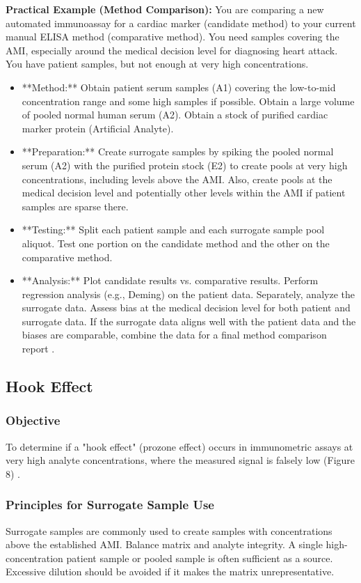 \documentclass{article}
\begin{document}
\textbf{Practical Example (Method Comparison):}
You are comparing a new automated immunoassay for a cardiac marker (candidate method) to your current manual ELISA method (comparative method). You need samples covering the AMI, especially around the medical decision level for diagnosing heart attack. You have patient samples, but not enough at very high concentrations.
\begin{itemize}
    \item **Method:** Obtain patient serum samples (A1) covering the low-to-mid concentration range and some high samples if possible. Obtain a large volume of pooled normal human serum (A2). Obtain a stock of purified cardiac marker protein (Artificial Analyte).
    \item **Preparation:** Create surrogate samples by spiking the pooled normal serum (A2) with the purified protein stock (E2) to create pools at very high concentrations, including levels above the AMI. Also, create pools at the medical decision level and potentially other levels within the AMI if patient samples are sparse there.
    \item **Testing:** Split each patient sample and each surrogate sample pool aliquot. Test one portion on the candidate method and the other on the comparative method.
    \item **Analysis:** Plot candidate results vs. comparative results. Perform regression analysis (e.g., Deming) on the patient data. Separately, analyze the surrogate data. Assess bias at the medical decision level for both patient and surrogate data. If the surrogate data aligns well with the patient data and the biases are comparable, combine the data for a final method comparison report \cite{CLSIEP09}.
\end{itemize}

\subsection{Hook Effect}

\subsubsection{Objective}
To determine if a "hook effect" (prozone effect) occurs in immunometric assays at very high analyte concentrations, where the measured signal is falsely low (Figure 8) \cite{CLSIEP34}.

\subsubsection{Principles for Surrogate Sample Use}
Surrogate samples are commonly used to create samples with concentrations above the established AMI. Balance matrix and analyte integrity. A single high-concentration patient sample or pooled sample is often sufficient as a source. Excessive dilution should be avoided if it makes the matrix unrepresentative.
\end{document}
